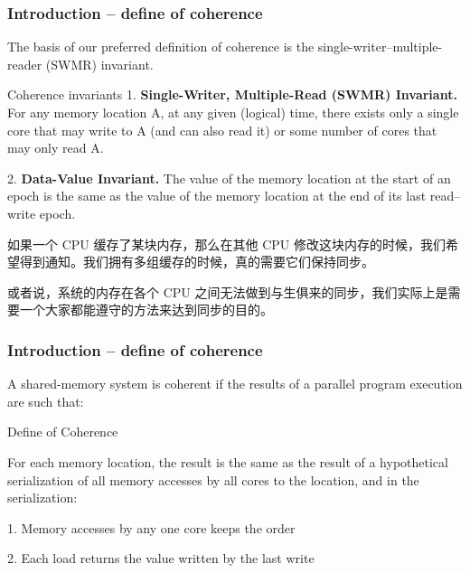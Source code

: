 \begin{frame}[plain]
	\frametitle{Introduction -- define of coherence}
	The basis of our preferred definition of coherence is the single-writer–multiple-reader (SWMR)
	invariant. 
	
	\begin{block}{Coherence invariants}
	1. \textbf{Single-Writer, Multiple-Read (SWMR) Invariant.} For any memory location A, at any
	given (logical) time, there exists only a single core that may write to A (and can also read it)
	or some number of cores that may only read A.
	
	2.  \textbf{Data-Value Invariant.} The value of the memory location at the start of an epoch is the same
	as the value of the memory location at the end of its last read–write epoch.
	
\end{block}
\pause
如果一个 CPU 缓存了某块内存，那么在其他 CPU 修改这块内存的时候，我们希望得到通知。我们拥有多组缓存的时候，真的需要它们保持同步。

或者说，系统的内存在各个 CPU 之间无法做到与生俱来的同步，我们实际上是需要一个大家都能遵守的方法来达到同步的目的。

\end{frame}


\begin{frame}[plain]
	\frametitle{Introduction -- define of coherence}
	
	A shared-memory system is coherent if the results of a parallel program
	execution are such that:
	\begin{block}{Define of Coherence}

		
		For each memory location, the result is the same as the result of a
		hypothetical serialization of all memory accesses by all cores to the
		location, and in the serialization:
		
		1. Memory accesses by any one core keeps the order
		
		
		2. Each load returns the value written by the last write
		
		
	\end{block}
	\pause

	
\end{frame}


